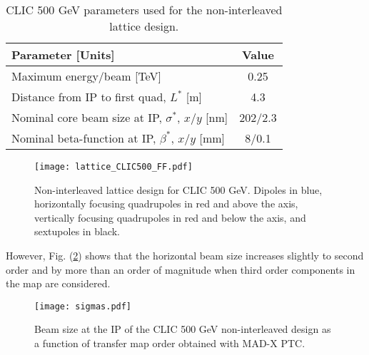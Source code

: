 \begin{table}[!htb]
\centering
 \begin{tabular}{|l|c|}\hline
  \textbf{Parameter [Units]} & \textbf{Value}\\\hline
  Maximum energy/beam [TeV] & 0.25\\
  Distance from IP to first quad, $L^*$ [m] & 4.3\\
  Nominal core beam size at IP, $\sigma^*$, $x/y$ [nm] & 202/2.3\\
  Nominal beta-function at IP, $\beta^*$, $x/y$ [mm] & 8/0.1\\\hline
 \end{tabular}\caption{CLIC 500 GeV parameters used for the non-interleaved lattice design.}\label{t:CLIC500GeVnoninterleaved}
\end{table}
\begin{figure}[!htb]
   \centering
   \hspace*{-0.6cm}
   \texttt{[image: lattice\_CLIC500\_FF.pdf]}
   \caption{Non-interleaved lattice design for CLIC 500 GeV. Dipoles in blue, horizontally focusing quadrupoles in red and above the axis, vertically focusing quadrupoles in red and below the axis, and sextupoles in black.}
   \label{f:MAD-X}
\end{figure}
However, Fig. (\ref{f-beamsize}) shows that the horizontal beam size increases slightly to second order and by more than an order of magnitude when third order components in the map are considered.\par
\begin{figure}[!htb]
   \centering
   \hspace*{-0.6cm}
   \texttt{[image: sigmas.pdf]}
   \caption{Beam size at the IP of the CLIC 500 GeV non-interleaved design as a function of transfer map order obtained with MAD-X PTC.}
   \label{f-beamsize}
\end{figure}
